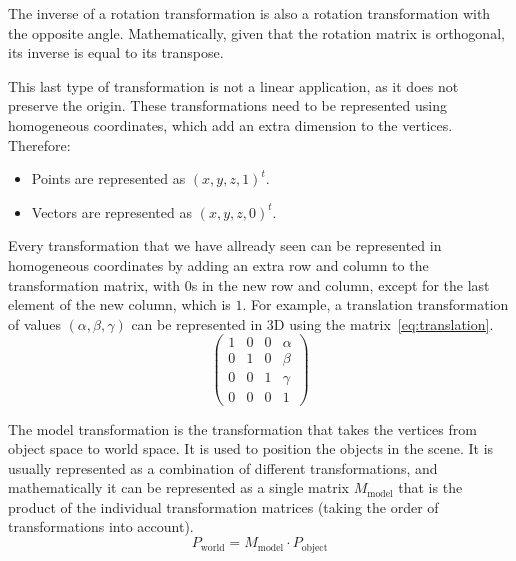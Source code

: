 \begin{description}
        The inverse of a rotation transformation is also a rotation transformation with the opposite angle. Mathematically, given that the rotation matrix is orthogonal, its inverse is equal to its transpose.
    \item[Translation]
    
    This last type of transformation is not a linear application, as it does not preserve the origin. These transformations need to be represented using homogeneous coordinates, which add an extra dimension to the vertices. Therefore:
    \begin{itemize}
        \item Points are represented as $(x, y, z, 1)^t$.
        \item Vectors are represented as $(x, y, z, 0)^t$.
    \end{itemize}

    Every transformation that we have allready seen can be represented in homogeneous coordinates by adding an extra row and column to the transformation matrix, with $0$s in the new row and column, except for the last element of the new column, which is $1$. For example, a translation transformation of values $(\alpha, \beta, \gamma)$ can be represented in 3D using the matrix~\eqref{eq:translation}.
    \begin{equation}
        \begin{pmatrix}
            1 & 0 & 0 & \alpha\\
            0 & 1 & 0 & \beta\\
            0 & 0 & 1 & \gamma\\
            0 & 0 & 0 & 1
        \end{pmatrix}
        \label{eq:translation}
    \end{equation}
\end{description}

The model transformation is the transformation that takes the vertices from object space to world space. It is used to position the objects in the scene. It is usually represented as a combination of different transformations, and mathematically it can be represented as a single matrix $M_{\text{model}}$ that is the product of the individual transformation matrices (taking the order of transformations into account).
\begin{equation*}
    P_{\text{world}} = M_{\text{model}} \cdot P_{\text{object}}
\end{equation*}

